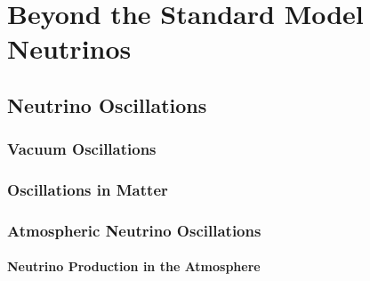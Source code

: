 \setchapterpreamble[u]{\margintoc}

\chapter{Beyond the Standard Model Neutrinos}


\section{Neutrino Oscillations} 

\subsection{Vacuum Oscillations}

\subsection{Oscillations in Matter}


\subsection{Atmospheric Neutrino Oscillations}

\subsubsection{Neutrino Production in the Atmosphere}


